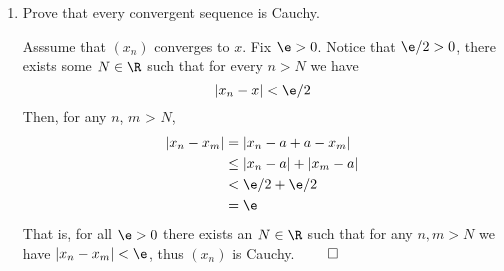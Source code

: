\documentclass[11pt]{exam}
\begin{document}
\begin{enumerate}
        \item Prove that every convergent sequence is Cauchy.
        \begin{solution}
            Asssume that $(x_n)$ converges to $x$. Fix $\e > 0$. Notice that $\e/2 > 0$, there exists some $N \in \R$ such that for every $n > N$ we have 
            $$|x_n - x | < \e / 2$$
            Then, for any $n$, $m$ > $N$, 
            \begin{align*}
                |x_n - x_m| &= |x_n - a + a - x_m| \\
                            &\leq |x_n - a| + |x_m - a| \\
                            &< \e/2 + \e/2 \\
                            &= \e
            \end{align*}
            That is, for all $\e > 0$ there exists an $N \in \R$ such that for any $n, m > N$ we have $|x_n - x_m| < \e$, thus $(x_n)$ is Cauchy. $\hspace*{0em plus 1fill} \qed$
        \end{solution}
    \end{enumerate}
\end{document}
